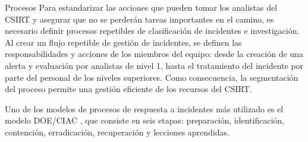    \begin{section}{Procesos}  
        Para estandarizar las acciones que pueden tomar los analistas del CSIRT y asegurar que no se perderán tareas importantes en el camino, es necesario definir procesos repetibles de clasificación de incidentes e investigación. Al crear un flujo repetible de gestión de incidentes, se definen las responsabilidades y acciones de los miembros del equipo: desde la creación de una alerta y evaluación por analistas de nivel 1, hasta el tratamiento del incidente por parte del personal de los niveles superiores. Como consecuencia, la segmentación del proceso permite una gestión eficiente de los recursos del CSIRT. \par
    	Uno de los modelos de procesos de respuesta a incidentes más utilizado es el modelo DOE/CIAC \cite{doe_ciac}, que consiste en seis etapas: preparación, identificación, contención, erradicación, recuperación y lecciones aprendidas.

   \end{section}
